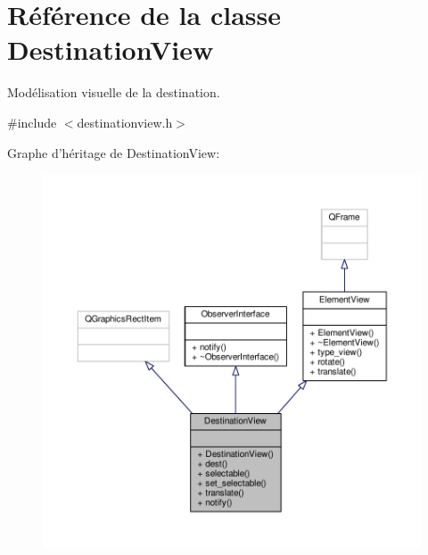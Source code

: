 \hypertarget{classDestinationView}{\section{Référence de la classe Destination\+View}
\label{classDestinationView}
}


Modélisation visuelle de la destination.  




{\ttfamily \#include $<$destinationview.\+h$>$}



Graphe d'héritage de Destination\+View\+:
\nopagebreak
\begin{figure}[H]
\begin{center}
\leavevmode
\includegraphics[width=350pt]{d6/d79/classDestinationView__inherit__graph}
\end{center}
\end{figure}


